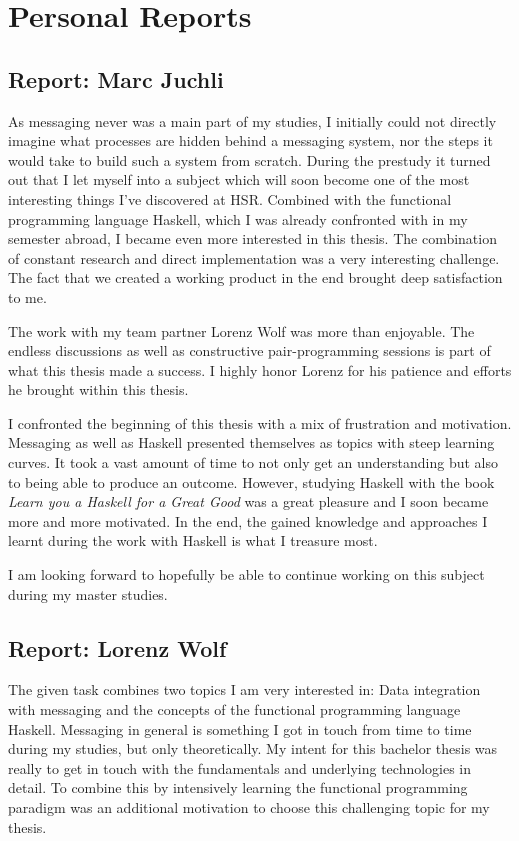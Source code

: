 \chapter{Personal Reports}

\section*{Report: Marc Juchli}
As messaging never was a main part of my studies, I initially could not
directly imagine what processes are hidden behind a messaging system, nor the
steps it would take to build such a system from scratch.  During the prestudy it
turned out that I let myself into a subject which will soon become one of the
most interesting things I've discovered at HSR. Combined with the functional
programming language Haskell, which I was already confronted with in my semester
abroad, I became even more interested in this thesis. The combination of
constant research and direct implementation was a very interesting challenge.
The fact that we created a working product in the end brought deep satisfaction
to me.

The work with my team partner Lorenz Wolf was more than enjoyable. The endless
discussions as well as constructive pair-programming sessions is part of what
this thesis made a success. I highly honor Lorenz for his patience and efforts
he brought within this thesis.

I confronted the beginning of this thesis with a mix of frustration and
motivation. Messaging as well as Haskell presented themselves as topics with
steep learning curves. It took a vast amount of time to not only get an
understanding but also to being able to produce an outcome.  However, studying
Haskell with the book \textit{Learn you a Haskell for a Great Good} was a great
pleasure and I soon became more and more motivated.  In the end, the gained
knowledge and approaches I learnt during the work with Haskell is what I
treasure most.

I am looking forward to hopefully be able to continue working on this subject
during my master studies.

\newpage
\section*{Report: Lorenz Wolf}
The given task combines two topics I am very interested in: Data integration
with messaging and the concepts of the functional programming language Haskell.
Messaging in general is something I got in touch from time to time during my
studies, but only theoretically. My intent for this bachelor thesis was really to
get in touch with the fundamentals and underlying technologies in detail. To
combine this by intensively learning the functional programming paradigm was an
additional motivation to choose this challenging topic for my thesis.

